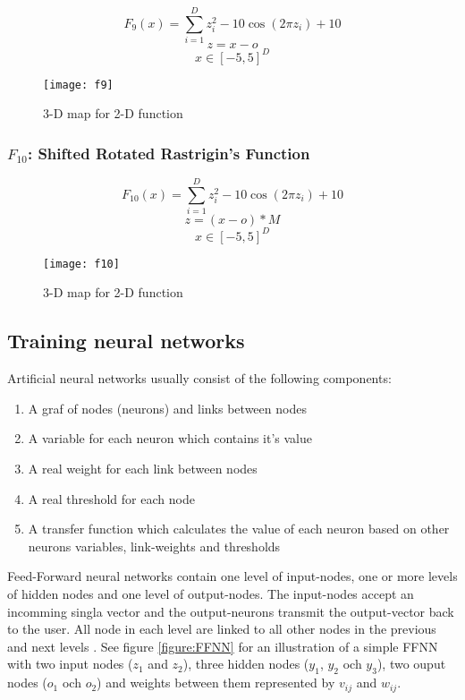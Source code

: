 \begin{equation}
  F_9(x)=\sum_{i=1}^{D}{z_i^2 - 10\cos{(2\pi z_i)} + 10}
\end{equation}
\[ z=x-o \]
\[ x \in [-5,5]^D \]

\begin{figure}[H]
  \centering
  \texttt{[image: f9]}
  \caption{3-D map for 2-D function}
  \label{f9}
\end{figure}

\subsubsection{$F_{10}$: Shifted Rotated Rastrigin’s Function}

\begin{equation}
  F_{10}(x)=\sum_{i=1}^{D}{z_i^2 - 10\cos{(2\pi z_i)} + 10}
\end{equation}
\[ z=(x-o)*M \]
\[ x \in [-5,5]^D \]

\begin{figure}[H]
  \centering
  \texttt{[image: f10]}
  \caption{3-D map for 2-D function}
  \label{f10}
\end{figure}

\subsection{Training neural networks}

Artificial neural networks usually consist of the following components:

\begin{enumerate}
  \item A graf of nodes (neurons) and links between nodes
  \item A variable for each neuron which contains it's value
  \item A real weight for each link between nodes
  \item A real threshold for each node
  \item A transfer function which calculates the value of each neuron based on other neurons variables, link-weights and thresholds
\end{enumerate}

Feed-Forward neural networks contain one level of input-nodes, one or more levels of hidden nodes and one level of output-nodes. The input-nodes accept an incomming singla vector and the output-neurons transmit the output-vector back to the user. All node in each level are linked to all other nodes in the previous and next levels \cite{montana1989training}. See figure \ref{figure:FFNN} for an illustration of a simple FFNN with two input nodes ($z_1$ and $z_2$), three hidden nodes ($y_1$, $y_2$ och $y_3$), two ouput nodes ($o_1$ och $o_2$) and weights between them represented by $v_{ij}$ and $w_{ij}$.


